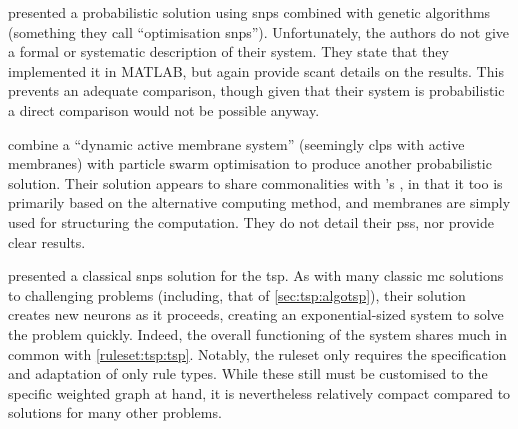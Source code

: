 
\citeauthor{Qi2018} \cite{Qi2018} presented a probabilistic solution using \gls{snps} combined with genetic algorithms (something they call ``optimisation \gls{snps}'').  Unfortunately, the authors do not give a formal or systematic description of their system.  They state that they implemented it in MATLAB, but again provide scant details on the results.  This prevents an adequate comparison, though given that their system is probabilistic a direct comparison would not be possible anyway.


\citeauthor{Wei2019} \cite{Wei2019} combine a \enquote{dynamic active membrane system} (seemingly \gls{clps} with active membranes) with particle swarm optimisation \cite{Sun2016} to produce another probabilistic solution.  Their solution appears to share commonalities with \citeauthor{Nishida2006}'s \cite{Nishida2006}, in that it too is primarily based on the alternative computing method, and membranes are simply used for structuring the computation.  They do not detail their \glspl{ps}, nor provide clear results.


\citeauthor{Zhang2019} \cite{Zhang2019} presented a classical \gls{snps} solution for the \gls{tsp}.  As with many classic \gls{mc} solutions to challenging problems \cite{Paun1999a} (including, that of \cref{sec:tsp:algotsp}), their solution creates new neurons as it proceeds, creating an exponential-sized system to solve the problem quickly.  Indeed, the overall functioning of the system shares much in common with \cref{ruleset:tsp:tsp}.  Notably, the \gls{ruleset} only requires the specification and adaptation of only rule types.  While these still must be customised to the specific weighted graph at hand, it is nevertheless relatively compact compared to solutions for many other problems.

